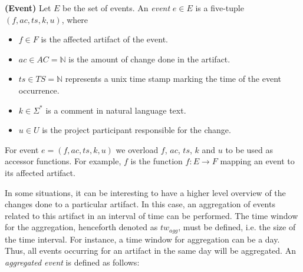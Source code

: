 \begin{definition} {\bf(Event)}
\label{def_event}
Let $E$ be the set of events. An \emph{event} $e \in E$ is a five-tuple $(f, ac, ts, k,u)$, where
\begin{itemize}
\item $f \in F$ is the affected artifact of the event.
\item $ac \in AC =  \mathbb{N}$ is the amount of change done in the artifact.
\item $ts \in TS = \mathbb{N}$ represents a unix time stamp marking the time of the event occurrence.
\item $k \in \Sigma ^* $ is a comment in natural language text.
\item $u \in U$ is the project participant responsible for the change.
\end{itemize}
\end{definition}

For event $e = (f, ac, ts, k,u)$ we overload $f$, $ac$, $ts$, $k$ and $u$ to be used as accessor functions. For example, $f$ is the function $f : E \rightarrow F$ mapping an event to its affected artifact.

In some situations, it can be interesting to have a higher level overview of the changes done to a particular artifact. In this case, an aggregation of events related to this artifact in an interval of time can be performed. The time window for the aggregation, henceforth denoted as $tw_{agg}$, must be defined, i.e. the size of the time interval. For instance, a time window for aggregation can be a day. Thus, all events occurring for an artifact in the same day will be aggregated. An \emph{aggregated event} is defined as follows:

